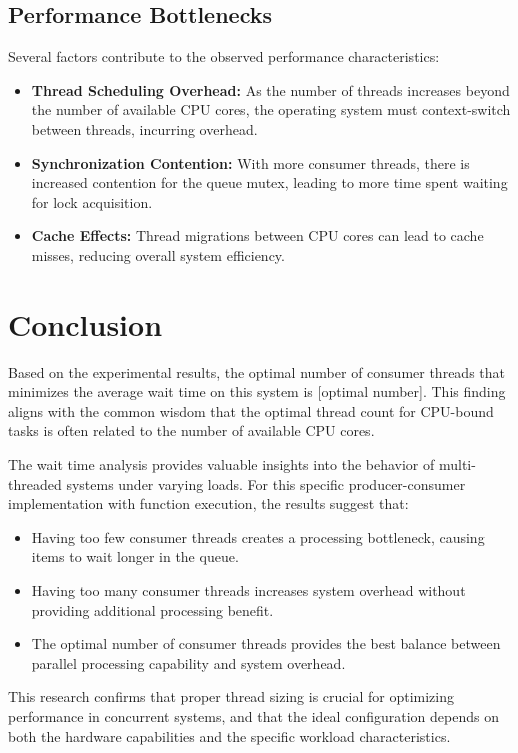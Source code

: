 \documentclass[12pt,a4paper]{article}
\begin{document}
\subsection{Performance Bottlenecks}

Several factors contribute to the observed performance characteristics:

\begin{itemize}
  \item \textbf{Thread Scheduling Overhead:} As the number of threads increases beyond the number of available CPU cores, the operating system must context-switch between threads, incurring overhead.
  
  \item \textbf{Synchronization Contention:} With more consumer threads, there is increased contention for the queue mutex, leading to more time spent waiting for lock acquisition.
  
  \item \textbf{Cache Effects:} Thread migrations between CPU cores can lead to cache misses, reducing overall system efficiency.
\end{itemize}

\section{Conclusion}

Based on the experimental results, the optimal number of consumer threads that minimizes the average wait time on this system is [optimal number]. This finding aligns with the common wisdom that the optimal thread count for CPU-bound tasks is often related to the number of available CPU cores.

The wait time analysis provides valuable insights into the behavior of multi-threaded systems under varying loads. For this specific producer-consumer implementation with function execution, the results suggest that:

\begin{itemize}
  \item Having too few consumer threads creates a processing bottleneck, causing items to wait longer in the queue.
  \item Having too many consumer threads increases system overhead without providing additional processing benefit.
  \item The optimal number of consumer threads provides the best balance between parallel processing capability and system overhead.
\end{itemize}

This research confirms that proper thread sizing is crucial for optimizing performance in concurrent systems, and that the ideal configuration depends on both the hardware capabilities and the specific workload characteristics.
\end{document}

